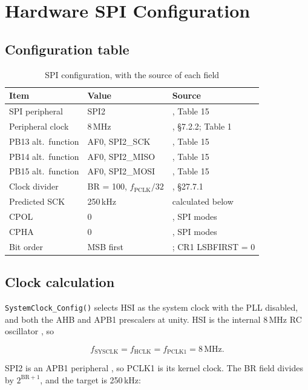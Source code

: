 \documentclass[conference]{IEEEtran}
\begin{document}
\section{Hardware SPI Configuration}

\subsection{Configuration table}

\begin{table}[htbp]
\caption{SPI configuration, with the source of each field}
\label{tab:spiconfig}
\centering
\begin{tabular}{llp{2.4cm}}
\toprule
Item & Value & Source \\
\midrule
SPI peripheral    & SPI2         & \cite{f051ds}, Table 15 \\
Peripheral clock  & 8\,MHz       & \cite{rm0091}, \S7.2.2; Table 1 \\
PB13 alt.\ function & AF0, SPI2\_SCK  & \cite{f051ds}, Table 15 \\
PB14 alt.\ function & AF0, SPI2\_MISO & \cite{f051ds}, Table 15 \\
PB15 alt.\ function & AF0, SPI2\_MOSI & \cite{f051ds}, Table 15 \\
Clock divider     & BR = 100, $f_{\text{PCLK}}/32$ & \cite{rm0091}, \S27.7.1 \\
Predicted SCK     & 250\,kHz     & calculated below \\
CPOL              & 0            & \cite{cat25640}, SPI modes \\
CPHA              & 0            & \cite{cat25640}, SPI modes \\
Bit order         & MSB first    & \cite{cat25640}; CR1 LSBFIRST = 0 \\
\bottomrule
\end{tabular}
\end{table}

\subsection{Clock calculation}

\texttt{SystemClock\_Config()} selects HSI as the system clock with the PLL
disabled, and both the AHB and APB1 prescalers at unity. HSI is the internal
8\,MHz RC oscillator \cite{rm0091}, so

\[ f_{\text{SYSCLK}} = f_{\text{HCLK}} = f_{\text{PCLK1}} = 8\,\text{MHz}. \]

SPI2 is an APB1 peripheral \cite{rm0091}, so PCLK1 is its kernel clock. The BR
field divides by $2^{\text{BR}+1}$, and the target is 250\,kHz:
\end{document}
